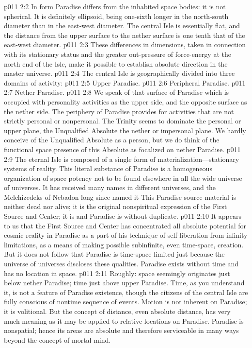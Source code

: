 \pc \vs p011 2:2 In form Paradise differs from the inhabited space bodies: it is not spherical. It is definitely ellipsoid, being one\hyp{}sixth longer in the north\hyp{}south diameter than in the east\hyp{}west diameter. The central Isle is essentially flat, and the distance from the upper surface to the nether surface is one tenth that of the east\hyp{}west diameter.
\vs p011 2:3 These differences in dimensions, taken in connection with its stationary status and the greater out\hyp{}pressure of force\hyp{}energy at the north end of the Isle, make it possible to establish absolute direction in the master universe.
\pc \vs p011 2:4 The central Isle is geographically divided into three domains of activity:
\pc \vs p011 2:5 \bibnobreakspace Upper Paradise.
\vs p011 2:6 \bibnobreakspace Peripheral Paradise.
\vs p011 2:7 \bibnobreakspace Nether Paradise.
\pc \vs p011 2:8 We speak of that surface of Paradise which is occupied with personality activities as the upper side, and the opposite surface as the nether side. The periphery of Paradise provides for activities that are not strictly personal or nonpersonal. The Trinity seems to dominate the personal or upper plane, the Unqualified Absolute the nether or impersonal plane. We hardly conceive of the Unqualified Absolute as a person, but we do think of the functional space presence of this Absolute as focalized on nether Paradise.
\pc \vs p011 2:9 The eternal Isle is composed of a single form of materialization---stationary systems of reality. This literal substance of Paradise is a homogeneous organization of space potency not to be found elsewhere in all the wide universe of universes. It has received many names in different universes, and the Melchizedeks of Nebadon long since named it  This Paradise source material is neither dead nor alive; it is the original nonspiritual expression of the First Source and Center; it is  and Paradise is without duplicate.
\vs p011 2:10 It appears to us that the First Source and Center has concentrated all absolute potential for cosmic reality in Paradise as a part of his technique of self\hyp{}liberation from infinity limitations, as a means of making possible subinfinite, even time\hyp{}space, creation. But it does not follow that Paradise is time\hyp{}space limited just because the universe of universes discloses these qualities. Paradise exists without time and has no location in space.
\vs p011 2:11 Roughly: space seemingly originates just below nether Paradise; time just above upper Paradise. Time, as you understand it, is not a feature of Paradise existence, though the citizens of the central Isle are fully conscious of nontime sequence of events. Motion is not inherent on Paradise; it is volitional. But the concept of distance, even absolute distance, has very much meaning as it may be applied to relative locations on Paradise. Paradise is nonspatial; hence its areas are absolute and therefore serviceable in many ways beyond the concept of mortal mind.\plusone
